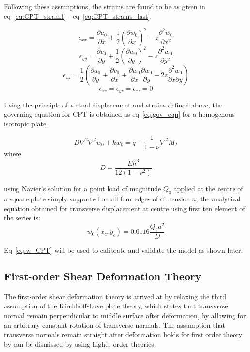 Following these assumptions, the strains are found to be as given in eq~\ref{eq:CPT_strain1} - eq~\ref{eq:CPT_strains_last}.

\begin{equation}
    \epsilon_{xx} = \frac{\partial u_0}{\partial x} + \frac{1}{2}(\frac{\partial w_0}{\partial x})^2 - z\frac{\partial^2 w_0}{\partial x^2}
    \label{eq:CPT_strain1}
\end{equation}
\begin{equation}
    \epsilon_{yy} = \frac{\partial v_0}{\partial y} + \frac{1}{2}(\frac{\partial w_0}{\partial y})^2 - z\frac{\partial^2 w_0}{\partial y^2}
\end{equation}
\begin{equation}
    \epsilon_{zz} = \frac{1}{2}(\frac{\partial u_0}{\partial y} + \frac{\partial v_0}{\partial x} + \frac{\partial w_0}{\partial x}\frac{\partial w_0}{\partial y} - 2z\frac{\partial^2 w_0}{\partial x\partial y})
\end{equation}
\begin{equation}
    \epsilon_{xz} = \epsilon_{yz} = \epsilon_{zz} = 0
    \label{eq:CPT_strains_last}
\end{equation}

Using the principle of virtual displacement and strains defined above, the governing equation for CPT is obtained as eq~\ref{eq:gov_eqn} for a homogenous isotropic plate.

\begin{equation}
    \label{eq:gov_eqn}
    D\nabla^2\nabla^2 w_0 + kw_0 = q - \frac{1}{ 1 - \nu}\nabla^2 M_T
\end{equation}
where\\
\begin{equation}
    D = \frac{Eh^3}{12(1 - \nu^2)}
    \label{eq:D}
\end{equation}

using Navier's solution for a point load of magnitude $Q_0$ applied at the centre of a square plate simply supported on all four edges of dimension $a$, the analytical equation obtained for transverse displacement at centre using first ten element of the series is:
\begin{equation}
    w_0(x_c, y_c) = 0.0116\frac{Q_0a^2}{D}
    \label{eq:w_CPT}
\end{equation}

Eq~\ref{eq:w_CPT} will be used to calibrate and validate the model as shown later.

\subsection{First-order Shear Deformation Theory}
The first-order shear deformation theory is arrived at by relaxing the third assumption of the Kirchhoff-Love plate theory, which states that transverse normal remain perpendicular to middle surface after deformation, by allowing for an arbitrary constant rotation of transverse normals. The assumption that transverse normals remain straight after deformation holds for first order theory by can be dismissed by using higher order theories.

